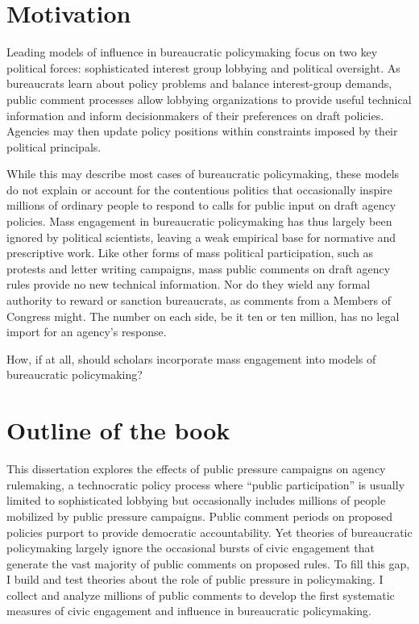 \documentclass[
]{book}
\begin{document}
\hypertarget{motivation}{%
\section*{Motivation}\label{motivation}}

Leading models of influence in bureaucratic policymaking focus on two key political forces: sophisticated interest group lobbying and political oversight.
As bureaucrats learn about policy problems and balance interest-group demands, public comment processes allow lobbying organizations to provide useful technical information and inform decisionmakers of their preferences on draft policies.
Agencies may then update policy positions within constraints imposed by their political principals.

While this may describe most cases of bureaucratic policymaking, these models do not explain or account for the contentious politics that occasionally inspire millions of ordinary people to respond to calls for public input on draft agency policies. Mass engagement in bureaucratic policymaking has thus largely been ignored by political scientists, leaving a weak empirical base for normative and prescriptive work.
Like other forms of mass political participation, such as protests and letter writing campaigns,
mass public comments on draft agency rules provide no new technical information.
Nor do they wield any formal authority to reward or sanction bureaucrats, as comments from a Members of Congress might.
The number on each side, be it ten or ten million, has no legal import for an agency's response.

How, if at all, should scholars incorporate mass engagement into models of bureaucratic policymaking?

\hypertarget{outline-of-the-book}{%
\section*{Outline of the book}\label{outline-of-the-book}}

This dissertation explores the effects of public pressure campaigns on agency rulemaking, a technocratic policy process where ``public participation'' is usually limited to sophisticated lobbying but occasionally includes millions of people mobilized by public pressure campaigns. Public comment periods on proposed policies purport to provide democratic accountability. Yet theories of bureaucratic policymaking largely ignore the occasional bursts of civic engagement that generate the vast majority of public comments on proposed rules. To fill this gap, I build and test theories about the role of public pressure in policymaking. I collect and analyze millions of public comments to develop the first systematic measures of civic engagement and influence in bureaucratic policymaking.
\end{document}
